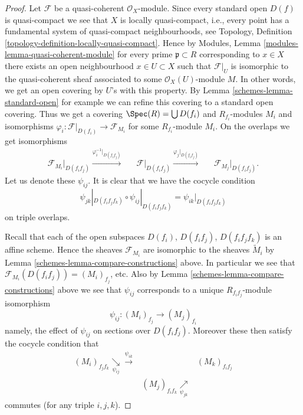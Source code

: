 \begin{proof}

Let $\mathcal{F}$ be a quasi-coherent $\mathcal{O}_X$-module.
Since every standard open $D(f)$ is quasi-compact we see that
$X$ is locally quasi-compact, i.e., every point has a fundamental
system of quasi-compact neighbourhoods, see Topology,
Definition \ref{topology-definition-locally-quasi-compact}.
Hence by Modules, Lemma \ref{modules-lemma-quasi-coherent-module}
for every prime $\mathfrak p \subset R$ corresponding to $x \in X$
there exists an open neighbourhood $x \in U \subset X$ such that
$\mathcal{F}|_U$ is isomorphic to the quasi-coherent
sheaf associated to some $\mathcal{O}_X(U)$-module $M$.
In other words, we get an open covering by $U$'s with this property.
By Lemma \ref{schemes-lemma-standard-open} for example we can refine this
covering to  a standard open covering.
Thus we get a covering $\Spec(R) = \bigcup D(f_i)$
and $R_{f_i}$-modules $M_i$ and isomorphisms
$\varphi_i : \mathcal{F}|_{D(f_i)} \to \mathcal{F}_{M_i}$
for some $R_{f_i}$-module $M_i$. On the overlaps
we get isomorphisms
$$
\begin{array}{ccccc}\mathcal{F}_{M_i}|_{D(f_if_j)}
\overset{\varphi_i^{-1}|_{D(f_if_j)}}{\longrightarrow} &  & \mathcal{F}|_{D(f_if_j)}
\overset{\varphi_j|_{D(f_if_j)}}{\longrightarrow} &  & \mathcal{F}_{M_j}|_{D(f_if_j)}.\end{array}
$$
Let us denote these $\psi_{ij}$. It is clear that
we have the cocycle condition
$$
\psi_{jk}|_{D(f_if_jf_k)}
\circ
\psi_{ij}|_{D(f_if_jf_k)}
=
\psi_{ik}|_{D(f_if_jf_k)}
$$
on triple overlaps.

\medskip\noindent
Recall that each of the open subspaces $D(f_i)$, $D(f_if_j)$,
$D(f_if_jf_k)$ is an affine scheme. Hence the sheaves $\mathcal{F}_{M_i}$
are isomorphic to the sheaves $\widetilde M_i$ by Lemma
\ref{schemes-lemma-compare-constructions} above. In particular we see that
$\mathcal{F}_{M_i}(D(f_if_j)) = (M_i)_{f_j}$, etc.
Also by Lemma \ref{schemes-lemma-compare-constructions} above we see
that $\psi_{ij}$ corresponds to a unique $R_{f_if_j}$-module isomorphism
$$
\psi_{ij} : (M_i)_{f_j} \longrightarrow (M_j)_{f_i}
$$
namely, the effect of $\psi_{ij}$ on sections over $D(f_if_j)$.
Moreover these then satisfy the cocycle condition that
$$
\begin{array}{ccc}(M_i)_{f_jf_k}
\underset{\psi_{ij}}{\searrow}\overset{\psi_{ik}}{\longrightarrow} &  & (M_k)_{f_if_j} \\  & (M_j)_{f_if_k} \underset{\psi_{jk}}{\nearrow} & \end{array}
$$
commutes (for any triple $i, j, k$).


\end{proof}
